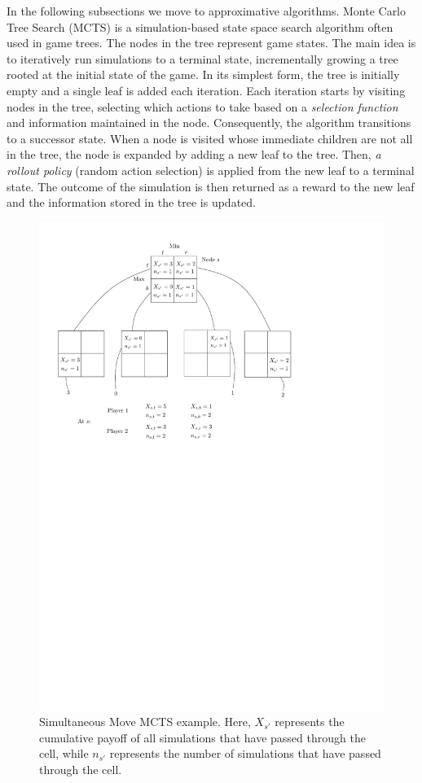 In the following subsections we move to approximative algorithms.
Monte Carlo Tree Search (MCTS) is a simulation-based state space search algorithm often used
in game trees. The nodes in the tree represent game states. The main idea is to iteratively run
simulations to a terminal state, incrementally growing a tree rooted at the initial state of the game. In
its simplest form, the tree is initially empty and a single leaf is added each iteration. Each iteration
starts by visiting nodes in the tree, selecting which actions to take based on a \emph{selection function} and
information maintained in the node. Consequently, the algorithm transitions to a successor state. When a
node is visited whose immediate children are not all in the tree, the node is expanded by adding a
new leaf to the tree. Then, \emph{a rollout policy} (\eg random action selection) is applied from the new
leaf to a terminal state. The outcome of the simulation is then returned as a reward to the new leaf
and the information stored in the tree is updated.

\begin{figure}[t]
\centering
\includegraphics[scale=0.7]{figures/smmcts-example}
\caption{Simultaneous Move MCTS example.
Here, $X_{s'}$ represents the cumulative payoff of all simulations that have passed
through the cell, while $n_{s'}$ represents the number of simulations that have passed through the cell.}
\label{fig:smmcts-example}
\end{figure}

